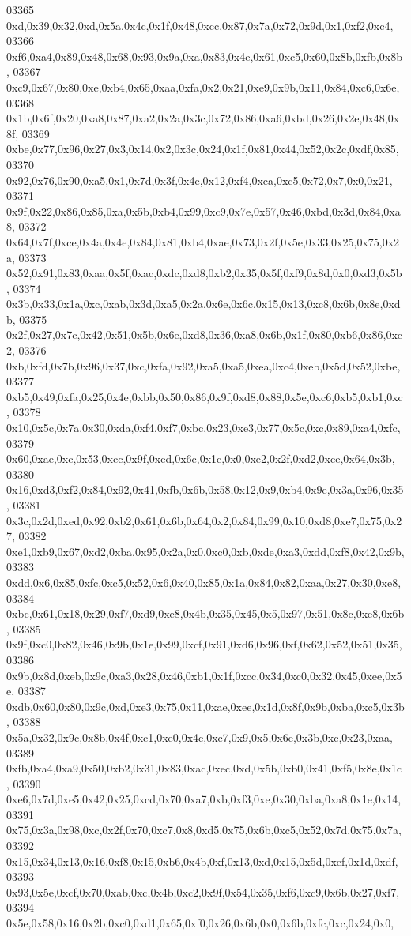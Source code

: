 \begin{DoxyCode}
03365   0xd,0x39,0x32,0xd,0x5a,0x4c,0x1f,0x48,0xcc,0x87,0x7a,0x72,0x9d,0x1,0xf2,0xc4,
03366   0xf6,0xa4,0x89,0x48,0x68,0x93,0x9a,0xa,0x83,0x4e,0x61,0xc5,0x60,0x8b,0xfb,0x8b,
03367   0xc9,0x67,0x80,0xe,0xb4,0x65,0xaa,0xfa,0x2,0x21,0xe9,0x9b,0x11,0x84,0xc6,0x6e,
03368   0x1b,0x6f,0x20,0xa8,0x87,0xa2,0x2a,0x3c,0x72,0x86,0xa6,0xbd,0x26,0x2e,0x48,0x8f,
03369   0xbe,0x77,0x96,0x27,0x3,0x14,0x2,0x3c,0x24,0x1f,0x81,0x44,0x52,0x2c,0xdf,0x85,
03370   0x92,0x76,0x90,0xa5,0x1,0x7d,0x3f,0x4e,0x12,0xf4,0xca,0xc5,0x72,0x7,0x0,0x21,
03371   0x9f,0x22,0x86,0x85,0xa,0x5b,0xb4,0x99,0xc9,0x7e,0x57,0x46,0xbd,0x3d,0x84,0xa8,
03372   0x64,0x7f,0xce,0x4a,0x4e,0x84,0x81,0xb4,0xae,0x73,0x2f,0x5e,0x33,0x25,0x75,0x2a,
03373   0x52,0x91,0x83,0xaa,0x5f,0xac,0xdc,0xd8,0xb2,0x35,0x5f,0xf9,0x8d,0x0,0xd3,0x5b,
03374   0x3b,0x33,0x1a,0xc,0xab,0x3d,0xa5,0x2a,0x6e,0x6c,0x15,0x13,0xc8,0x6b,0x8e,0xdb,
03375   0x2f,0x27,0x7c,0x42,0x51,0x5b,0x6e,0xd8,0x36,0xa8,0x6b,0x1f,0x80,0xb6,0x86,0xc2,
03376   0xb,0xfd,0x7b,0x96,0x37,0xc,0xfa,0x92,0xa5,0xa5,0xea,0xc4,0xeb,0x5d,0x52,0xbe,
03377   0xb5,0x49,0xfa,0x25,0x4e,0xbb,0x50,0x86,0x9f,0xd8,0x88,0x5e,0xc6,0xb5,0xb1,0xc,
03378   0x10,0x5c,0x7a,0x30,0xda,0xf4,0xf7,0xbc,0x23,0xe3,0x77,0x5c,0xc,0x89,0xa4,0xfc,
03379   0x60,0xae,0xc,0x53,0xcc,0x9f,0xed,0x6c,0x1c,0x0,0xe2,0x2f,0xd2,0xce,0x64,0x3b,
03380   0x16,0xd3,0xf2,0x84,0x92,0x41,0xfb,0x6b,0x58,0x12,0x9,0xb4,0x9e,0x3a,0x96,0x35,
03381   0x3c,0x2d,0xed,0x92,0xb2,0x61,0x6b,0x64,0x2,0x84,0x99,0x10,0xd8,0xe7,0x75,0x27,
03382   0xe1,0xb9,0x67,0xd2,0xba,0x95,0x2a,0x0,0xc0,0xb,0xde,0xa3,0xdd,0xf8,0x42,0x9b,
03383   0xdd,0x6,0x85,0xfc,0xc5,0x52,0x6,0x40,0x85,0x1a,0x84,0x82,0xaa,0x27,0x30,0xe8,
03384   0xbc,0x61,0x18,0x29,0xf7,0xd9,0xe8,0x4b,0x35,0x45,0x5,0x97,0x51,0x8c,0xe8,0x6b,
03385   0x9f,0xc0,0x82,0x46,0x9b,0x1e,0x99,0xcf,0x91,0xd6,0x96,0xf,0x62,0x52,0x51,0x35,
03386   0x9b,0x8d,0xeb,0x9c,0xa3,0x28,0x46,0xb1,0x1f,0xcc,0x34,0xc0,0x32,0x45,0xee,0x5e,
03387   0xdb,0x60,0x80,0x9c,0xd,0xe3,0x75,0x11,0xae,0xee,0x1d,0x8f,0x9b,0xba,0xc5,0x3b,
03388   0x5a,0x32,0x9c,0x8b,0x4f,0xc1,0xe0,0x4c,0xc7,0x9,0x5,0x6e,0x3b,0xc,0x23,0xaa,
03389   0xfb,0xa4,0xa9,0x50,0xb2,0x31,0x83,0xac,0xec,0xd,0x5b,0xb0,0x41,0xf5,0x8e,0x1c,
03390   0xe6,0x7d,0xe5,0x42,0x25,0xcd,0x70,0xa7,0xb,0xf3,0xe,0x30,0xba,0xa8,0x1e,0x14,
03391   0x75,0x3a,0x98,0xc,0x2f,0x70,0xc7,0x8,0xd5,0x75,0x6b,0xc5,0x52,0x7d,0x75,0x7a,
03392   0x15,0x34,0x13,0x16,0xf8,0x15,0xb6,0x4b,0xf,0x13,0xd,0x15,0x5d,0xef,0x1d,0xdf,
03393   0x93,0x5e,0xcf,0x70,0xab,0xc,0x4b,0xc2,0x9f,0x54,0x35,0xf6,0xc9,0x6b,0x27,0xf7,
03394   0x5e,0x58,0x16,0x2b,0xc0,0xd1,0x65,0xf0,0x26,0x6b,0x0,0x6b,0xfc,0xc,0x24,0x0,

\end{DoxyCode}
